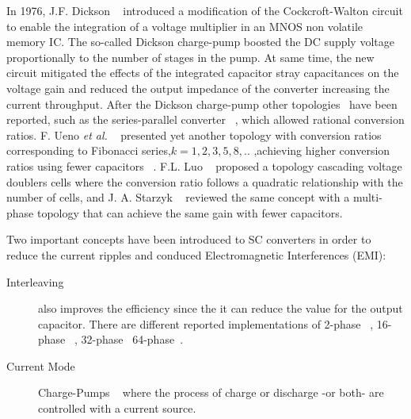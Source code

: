 In 1976, J.F. Dickson ~\cite{76Dickson} introduced a modification of the Cockcroft-Walton circuit to enable the integration of a voltage multiplier in an MNOS non volatile memory IC. The so-called Dickson charge-pump boosted the DC supply voltage proportionally to the number of stages in the pump. At same time, the new circuit mitigated the effects of the integrated capacitor stray capacitances on the voltage gain and reduced the output impedance of the converter increasing the current throughput. After the Dickson charge-pump other topologies~\cite{09Seeman} have been reported, such as the series-parallel converter ~\cite{94Ngo,94Cheong}, which allowed rational conversion ratios. F. Ueno \textit{et al.} ~\cite{91Ueno} presented yet another topology with conversion ratios corresponding to Fibonacci series,$k=1,2,3,5,8,..$ ,achieving higher conversion ratios using fewer capacitors ~\cite{95Makowski,09Allasasmeh}.  F.L. Luo  ~\cite{02Luo} proposed a topology cascading voltage doublers cells where the conversion ratio follows a quadratic relationship with the number of cells, and J. A. Starzyk ~\cite{01Starzyk} reviewed the same concept with a multi-phase topology that can achieve the same gain with fewer capacitors.



Two important concepts have been introduced to SC converters in order to reduce the current ripples and conduced Electromagnetic Interferences (EMI):
\begin{description}
  \item[Interleaving] also improves the efficiency since the it can reduce the value for the output capacitor. There are different reported implementations of 2-phase ~\cite{07Chang,99Chung}, 16-phase ~\cite{09Breussegem,14Andersen}, 32-phase~\cite{10Le} 64-phase~\cite{15Andersen}.
  \item[Current Mode] Charge-Pumps ~\cite{96Zhu,09Das} where the process of charge or discharge -or both- are controlled with a current source.
\end{description}


